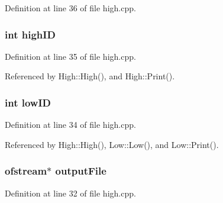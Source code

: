 Definition at line 36 of file high.cpp.
\subsubsection{\setlength{\rightskip}{0pt plus 5cm}int {\bf high\-ID}}\label{high_8cpp_a2}




Definition at line 35 of file high.cpp.

Referenced by High::High(), and High::Print().
\subsubsection{\setlength{\rightskip}{0pt plus 5cm}int {\bf low\-ID}}\label{high_8cpp_a1}




Definition at line 34 of file high.cpp.

Referenced by High::High(), Low::Low(), and Low::Print().
\subsubsection{\setlength{\rightskip}{0pt plus 5cm}ofstream$\ast$ {\bf output\-File}}\label{high_8cpp_a0}




Definition at line 32 of file high.cpp.